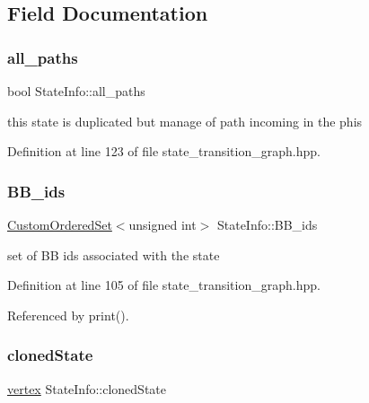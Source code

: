 \subsection{Field Documentation}
\mbox{\label{structStateInfo_ae0b73ddc83acae2d5e1ffb6d01894b57}} 
\subsubsection{\texorpdfstring{all\+\_\+paths}{all\_paths}}
{\footnotesize\ttfamily bool State\+Info\+::all\+\_\+paths}



this state is duplicated but manage of path incoming in the phis 



Definition at line 123 of file state\+\_\+transition\+\_\+graph.\+hpp.

\mbox{\label{structStateInfo_ab90956fbe5d140d76c113535b830b41a}} 
\subsubsection{\texorpdfstring{B\+B\+\_\+ids}{BB\_ids}}
{\footnotesize\ttfamily \hyperlink{classCustomOrderedSet}{Custom\+Ordered\+Set}$<$unsigned int$>$ State\+Info\+::\+B\+B\+\_\+ids}



set of BB ids associated with the state 



Definition at line 105 of file state\+\_\+transition\+\_\+graph.\+hpp.



Referenced by print().

\mbox{\label{structStateInfo_a445827ad7c0440518f07baf5c62eb20b}} 
\subsubsection{\texorpdfstring{cloned\+State}{clonedState}}
{\footnotesize\ttfamily \hyperlink{graph_8hpp_abefdcf0544e601805af44eca032cca14}{vertex} State\+Info\+::cloned\+State}



